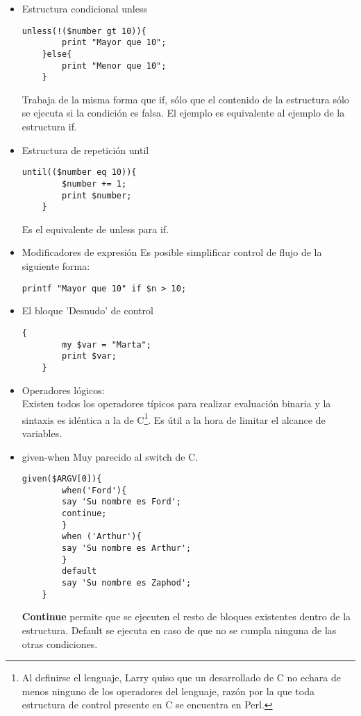 \documentclass[12pt,a4paper]{memoir} %
\begin{document}
\begin{itemize}
	\newpage
	\item Estructura condicional unless
	\lstset{language=Perl, showspaces=false}
	\begin{lstlisting}[frame=single, showspaces=false, showstringspaces=false]
	unless(!($number gt 10)){
		print "Mayor que 10";
	}else{
		print "Menor que 10";
	}
	\end{lstlisting}
	Trabaja de la misma forma que if, sólo que el contenido de la estructura sólo se ejecuta si la condición es falsa. El ejemplo es equivalente al ejemplo de la estructura if.
	\item	Estructura de repetición until
	\lstset{language=Perl, showspaces=false}
	\begin{lstlisting}[frame=single, showspaces=false]
	until(($number eq 10)){
		$number += 1;
		print $number;
	}
	\end{lstlisting}
	Es el equivalente de unless para if.
	\item Modificadores de expresión
	Es posible simplificar control de flujo de la siguiente forma:
	\begin{lstlisting}[frame=single, showspaces=false, showstringspaces=false]
	printf "Mayor que 10" if $n > 10;
	\end{lstlisting}
	\item El bloque 'Desnudo' de control
	\lstset{language=Perl, showspaces=false}
	\begin{lstlisting}[frame=single, showspaces=false]
	{
		my $var = "Marta";
		print $var;
	}
	\end{lstlisting}
	
	\item Operadores lógicos:\\
	Existen todos los operadores típicos para realizar evaluación binaria y la sintaxis es idéntica a la de C\footnote{Al definirse el lenguaje, Larry quiso que un desarrollado de C no echara de menos ninguno de los operadores del lenguaje, razón por la que toda estructura de control presente en C se encuentra en Perl.}.
	Es útil a la hora de limitar el alcance de variables.
	\item given-when
	Muy parecido al switch de C.
	\lstset{language=Perl, showspaces=false}
	\begin{lstlisting}[frame=single, showspaces=false, showstringspaces=false]
	given($ARGV[0]){
		when('Ford'){
		say 'Su nombre es Ford'; 
		continue;
		}
		when ('Arthur'){
		say 'Su nombre es Arthur';
		}
		default
		say 'Su nombre es Zaphod';
	}
	\end{lstlisting}
	\textbf{Continue} permite que se ejecuten el resto de bloques existentes dentro de la estructura. Default se ejecuta en caso de que no se cumpla ninguna de las otras condiciones.
	\end{itemize}
	
\end{document}
